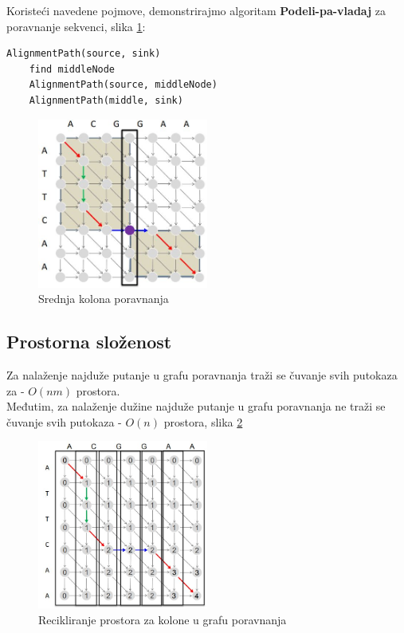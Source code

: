 Koristeći navedene pojmove, demonstrirajmo algoritam \textbf{Podeli-pa-vladaj} za poravnanje sekvenci, slika \ref{slika:podeliPaVladaj}: \\

\begin{lstlisting}
AlignmentPath(source, sink)
    find middleNode
    AlignmentPath(source, middleNode)
    AlignmentPath(middle, sink)
\end{lstlisting}

\begin{figure}[h]
\centering
\includegraphics[width=0.5\textwidth]{poglavlja/5/slike/podeliPaVladaj.JPG}
\caption{Srednja kolona poravnanja}
\label{slika:podeliPaVladaj}
\end{figure}

\subsection{Prostorna složenost}
Za nalaženje najduže putanje u grafu poravnanja traži se čuvanje svih putokaza za - $O(nm)$ prostora. \\
Međutim, za nalaženje dužine najduže putanje u grafu poravnanja ne traži se čuvanje svih putokaza - $O(n)$ prostora, slika \ref{slika:prostornaSlozenost}

\begin{figure}[h]
\centering
\includegraphics[width=0.5\textwidth]{poglavlja/5/slike/prostornaSlozenost2.JPG}
\caption{Recikliranje prostora za kolone u grafu poravnanja}
\label{slika:prostornaSlozenost}
\end{figure}

